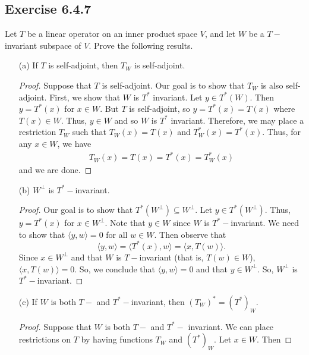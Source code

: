 \subsection*{Exercise 6.4.7} Let \( T  \) be a linear operator on an inner product space \( V  \), and let \( W  \) be a \( T- \)invariant subspace of \( V  \). Prove the following results. 
\begin{enumerate}
    \item[(a)] If \( T  \) is self-adjoint, then \( {T}_{W}  \) is self-adjoint. 
        \begin{proof}
        Suppose that \( T  \) is self-adjoint. Our goal is to show that \( {T}_{W} \) is also self-adjoint. First, we show that \( W  \) is \( T^{*}  \) invariant. Let \( y \in T^{*}(W) \). Then \( y = T^{*}(x) \) for \( x \in W  \). But \( T  \) is self-adjoint, so \( y = T^{*}(x) = T(x)  \) where \( T(x) \in W  \). Thus, \( y \in W  \) and so \( W  \) is \( T^{*} \) invariant. Therefore, we may place a restriction \( {T}_{W}  \) such that \( {T}_{W}(x) = T(x) \) and \({T}_{W}^{*}(x) = T^{*}(x)  \). Thus,
     for any \( x \in W  \), we have
        \begin{align*}
            {T}_{W}(x) = T(x) = T^{*}(x) = {T}_{W}^{*}(x)
        \end{align*}
        and we are done.
        \end{proof}
    \item[(b)] \( W^{\perp}  \) is \( T^{*}- \)invariant.
        \begin{proof}
        Our goal is to show that \( T^{*}(W^{\perp}) \subseteq W^{\perp} \). Let \( y \in T^{*}(W^{\perp}) \). Thus, \( y = T^{*}(x)  \) for \( x \in W^{\perp}  \). Note that \( y \in W   \) since \( W   \) is \( T^{*}- \)invariant. We need to show that \( \langle y , w  \rangle = 0  \) for all \( w \in W  \). Then observe that
        \[  \langle y , w \rangle = \langle T^{*}(x) , w  \rangle = \langle x  , T(w) \rangle.  \]
        Since \( x \in W^{\perp} \) and that \( W  \) is \( T- \)invariant (that is, \( T(w) \in W  \)), \( \langle x  , T(w) \rangle = 0  \). So, we conclude that \( \langle  y  , w  \rangle = 0  \) and that \( y \in W^{\perp} \). So, \( W^{\perp} \) is \( T^{*} -  \)invariant.
        \end{proof}
    \item[(c)] If \( W  \) is both \( T- \) and \( T^{*}- \)invariant, then \( ({T}_{W})^{*} = {(T^{*})}_{W} \).
        \begin{proof}
        Suppose that \( W  \) is both \( T-  \) and \( T^{*}- \) invariant. We can place restrictions on \( T  \) by having functions \( {T}_{W} \) and \( (T^{*})_W  \). Let \( x \in W  \). Then

\end{proof}
\end{enumerate}
